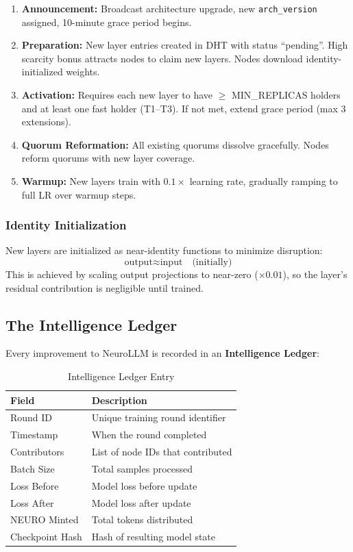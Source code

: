 \documentclass[11pt,a4paper]{article}
\begin{document}
\begin{enumerate}
    \item \textbf{Announcement:} Broadcast architecture upgrade, new \texttt{arch\_version} assigned, 10-minute grace period begins.
    \item \textbf{Preparation:} New layer entries created in DHT with status ``pending''. High scarcity bonus attracts nodes to claim new layers. Nodes download identity-initialized weights.
    \item \textbf{Activation:} Requires each new layer to have $\geq$ MIN\_REPLICAS holders and at least one fast holder (T1--T3). If not met, extend grace period (max 3 extensions).
    \item \textbf{Quorum Reformation:} All existing quorums dissolve gracefully. Nodes reform quorums with new layer coverage.
    \item \textbf{Warmup:} New layers train with $0.1\times$ learning rate, gradually ramping to full LR over warmup steps.
\end{enumerate}

\subsubsection{Identity Initialization}
New layers are initialized as near-identity functions to minimize disruption:
\begin{equation}
\text{output} \approx \text{input} \quad \text{(initially)}
\end{equation}
This is achieved by scaling output projections to near-zero ($\times 0.01$), so the layer's residual contribution is negligible until trained.

\subsection{The Intelligence Ledger}

Every improvement to NeuroLLM is recorded in an \textbf{Intelligence Ledger}:

\begin{table}[H]
\centering
\caption{Intelligence Ledger Entry}
\begin{tabular}{@{}ll@{}}
\toprule
\textbf{Field} & \textbf{Description} \\
\midrule
Round ID & Unique training round identifier \\
Timestamp & When the round completed \\
Contributors & List of node IDs that contributed \\
Batch Size & Total samples processed \\
Loss Before & Model loss before update \\
Loss After & Model loss after update \\
NEURO Minted & Total tokens distributed \\
Checkpoint Hash & Hash of resulting model state \\
\bottomrule
\end{tabular}
\end{table}
\end{document}
